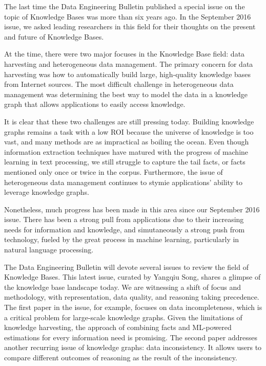 ﻿\documentclass[11pt]{article}
\begin{document}
The last time the Data Engineering Bulletin published a special issue on the topic of Knowledge Bases was more than six years ago. In the September 2016 issue, we asked leading researchers in this field for their thoughts on the present and future of Knowledge Bases.


At the time, there were two major focuses in the Knowledge Base field: data harvesting and heterogeneous data management. The primary concern for data harvesting was how to automatically build large, high-quality knowledge bases from Internet sources. The most difficult challenge in heterogeneous data management was determining the best way to model the data in a knowledge graph that allows applications to easily access knowledge.


It is clear that these two challenges are still pressing today. Building knowledge graphs remains a task with a low ROI because the universe of knowledge is too vast, and many methods are as impractical as boiling the ocean.  Even though information extraction techniques have matured with the progress of machine learning in text processing, we still struggle to capture the tail facts, or facts mentioned only once or twice in the corpus. Furthermore, the issue of heterogeneous data management continues to stymie applications' ability to leverage knowledge graphs. 


Nonetheless, much progress has been made in this area since our
September 2016 issue. There has been a strong pull from applications
due to their increasing needs for information and knowledge, and
simutaneously a strong push from technology, fueled by the great
process in machine learning, particularly in natural language
processing.


The Data Engineering Bulletin will devote several issues to review the field of Knowledge Bases. This latest issue, curated by Yangqiu Song, shares a glimpse of the knowledge base landscape today. We are witnessing a shift of focus and methodology, with representation, data quality, and  reasoning taking precedence. The first paper in the issue, for example, focuses on data incompleteness, which is a critical problem for large-scale knowledge graphs. Given the limitations of knowledge harvesting, the approach of combining facts and ML-powered estimations for every information need is promising. The second paper addresses another recurring issue of knowledge graphs: data inconsistency. It allows users  to compare different outcomes of reasoning as the result of the inconsistency.
\end{document}
